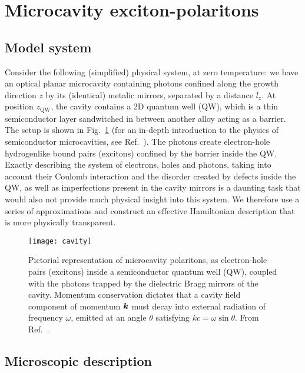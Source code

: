 \section{Microcavity exciton-polaritons}
\label{sec:polaritons}


\subsection{Model system}
\label{subsec:model}



Consider the following (simplified) physical system, at zero
temperature: we have an optical planar microcavity containing photons
confined along the growth direction $z$ by its (identical) metalic
mirrors, separated by a distance $l_z$. At position $z_{\text{QW}}$,
the cavity contains a 2D quantum well (QW), which is a thin
semiconductor layer sandwitched in between another alloy acting as a
barrier. The setup is shown in Fig.~\ref{fig:cavity-polaritons} (for
an in-depth introduction to the physics of semiconductor
microcavities, see Ref.~\cite{9780199228942}). The photons create
electron-hole hydrogenlike bound pairs (excitons) confined by the
barrier inside the QW. Exactly describing the system of electrons,
holes and photons, taking into account their Coulomb interaction and
the disorder created by defects inside the QW, as well as
imperfections present in the cavity mirrors is a daunting task that
would also not provide much physical insight into this system. We
therefore use a series of approximations and construct an effective
Hamiltonian description that is more physically transparent.
%
\begin{figure}[tb]\centering
  \texttt{[image: cavity]}
  \caption{
    Pictorial representation of microcavity polaritons, as electron-hole pairs (excitons) inside a semiconductor quantum well (QW), 
    coupled with the photons trapped by the dielectric Bragg mirrors of the cavity. 
    Momentum conservation dictates that a cavity field component of momentum $\bm{k}$ must decay into external radiation of frequency $\omega$, emitted at an angle $\theta$ satisfying $k c = \omega \sin\theta$.
    From Ref.~\cite{Kasprzak_2006}.
  }\label{fig:cavity-polaritons}
\end{figure}

\subsection{Microscopic description}
\label{subsec:microscopic}


